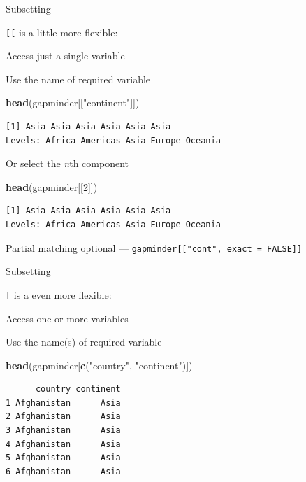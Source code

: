 \documentclass[10pt,ignorenonframetext,compress, aspectratio=169]{beamer}
\newenvironment{Shaded}{\begin{snugshade}}{\end{snugshade}}
\newcommand{\KeywordTok}[1]{\textcolor[rgb]{0.13,0.29,0.53}{\textbf{{#1}}}}
\newcommand{\DecValTok}[1]{\textcolor[rgb]{0.00,0.00,0.81}{{#1}}}
\newcommand{\StringTok}[1]{\textcolor[rgb]{0.31,0.60,0.02}{{#1}}}
\newcommand{\NormalTok}[1]{{#1}}
\begin{document}
\begin{frame}[fragile]{Subsetting}

\texttt{{[}{[}} is a little more flexible:

Access just a single variable

Use the name of required variable

\scriptsize

\begin{Shaded}
\begin{Highlighting}[]
\KeywordTok{head}\NormalTok{(gapminder[[}\StringTok{"continent"}\NormalTok{]])}
\end{Highlighting}
\end{Shaded}

\begin{verbatim}
[1] Asia Asia Asia Asia Asia Asia
Levels: Africa Americas Asia Europe Oceania
\end{verbatim}

\normalsize

Or select the \emph{n}th component

\scriptsize

\begin{Shaded}
\begin{Highlighting}[]
\KeywordTok{head}\NormalTok{(gapminder[[}\DecValTok{2}\NormalTok{]])}
\end{Highlighting}
\end{Shaded}

\begin{verbatim}
[1] Asia Asia Asia Asia Asia Asia
Levels: Africa Americas Asia Europe Oceania
\end{verbatim}

\normalsize

Partial matching optional ---
\texttt{gapminder{[}{[}"cont", exact = FALSE{]}{]}}

\end{frame}

\begin{frame}[fragile]{Subsetting}

\texttt{{[}} is a even more flexible:

Access one or more variables

Use the name(s) of required variable

\scriptsize

\begin{Shaded}
\begin{Highlighting}[]
\KeywordTok{head}\NormalTok{(gapminder[}\KeywordTok{c}\NormalTok{(}\StringTok{"country"}\NormalTok{, }\StringTok{"continent"}\NormalTok{)])}
\end{Highlighting}
\end{Shaded}

\begin{verbatim}
      country continent
1 Afghanistan      Asia
2 Afghanistan      Asia
3 Afghanistan      Asia
4 Afghanistan      Asia
5 Afghanistan      Asia
6 Afghanistan      Asia
\end{verbatim}

\normalsize

\end{frame}
\end{document}
